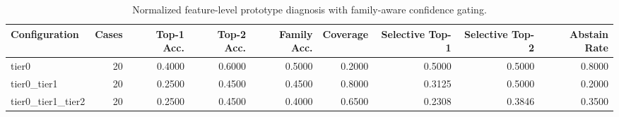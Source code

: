 \begin{table}[t]
\centering
\caption{Normalized feature-level prototype diagnosis with family-aware confidence gating.}
\label{tab:dice_stressor_hierarchical_diagnosis}
\footnotesize
\begin{tabular}{lrrrrrrrr}
\toprule
Configuration & Cases & Top-1 Acc. & Top-2 Acc. & Family Acc. & Coverage & Selective Top-1 & Selective Top-2 & Abstain Rate \\
\midrule
tier0 & 20 & 0.4000 & 0.6000 & 0.5000 & 0.2000 & 0.5000 & 0.5000 & 0.8000 \\
tier0_tier1 & 20 & 0.2500 & 0.4500 & 0.4500 & 0.8000 & 0.3125 & 0.5000 & 0.2000 \\
tier0_tier1_tier2 & 20 & 0.2500 & 0.4500 & 0.4000 & 0.6500 & 0.2308 & 0.3846 & 0.3500 \\
\bottomrule
\end{tabular}

\end{table}
